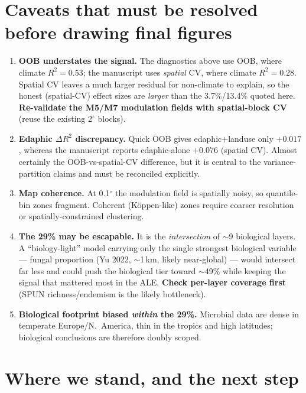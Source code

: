 \documentclass[11pt,a4paper]{article}
\begin{document}
\section{Caveats that must be resolved before drawing final figures}

\begin{enumerate}[nosep]
  \item \textbf{OOB understates the signal.} The diagnostics above use OOB, where
  climate $R^2=0.53$; the manuscript uses \emph{spatial} CV, where climate
  $R^2=0.28$. Spatial CV leaves a much larger residual for non-climate to explain,
  so the honest (spatial-CV) effect sizes are \emph{larger} than the
  3.7\%/13.4\% quoted here. \textbf{Re-validate the M5/M7 modulation fields with
  spatial-block CV} (reuse the existing 2$^\circ$ blocks).
  \item \textbf{Edaphic $\Delta R^2$ discrepancy.} Quick OOB gives
  edaphic$+$landuse only $+0.017$, whereas the manuscript reports edaphic-alone
  $+0.076$ (spatial CV). Almost certainly the OOB-vs-spatial-CV difference, but it
  is central to the variance-partition claims and must be reconciled explicitly.
  \item \textbf{Map coherence.} At 0.1$^\circ$ the modulation field is spatially
  noisy, so quantile-bin zones fragment. Coherent (Köppen-like) zones require
  coarser resolution or spatially-constrained clustering.
  \item \textbf{The 29\% may be escapable.} It is the \emph{intersection} of
  $\sim$9 biological layers. A ``biology-light'' model carrying only the single
  strongest biological variable --- fungal proportion (Yu 2022, $\sim$1\,km,
  likely near-global) --- would intersect far less and could push the biological
  tier toward $\sim$49\% while keeping the signal that mattered most in the ALE.
  \textbf{Check per-layer coverage first} (SPUN richness/endemism is the likely
  bottleneck).
  \item \textbf{Biological footprint biased \emph{within} the 29\%.} Microbial
  data are dense in temperate Europe/N.\ America, thin in the tropics and high
  latitudes; biological conclusions are therefore doubly scoped.
\end{enumerate}

\section{Where we stand, and the next step}
\end{document}
